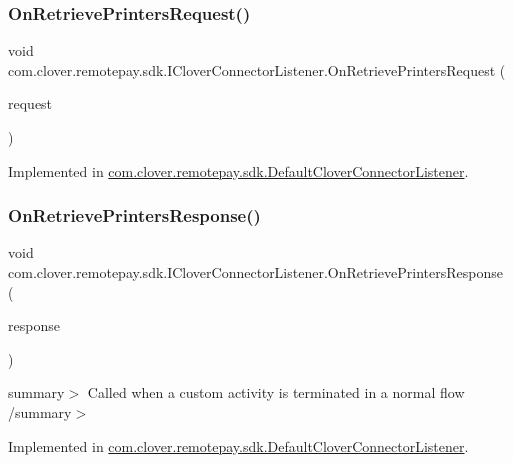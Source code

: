 \subsubsection{\texorpdfstring{On\+Retrieve\+Printers\+Request()}{OnRetrievePrintersRequest()}}
{\footnotesize\ttfamily void com.\+clover.\+remotepay.\+sdk.\+I\+Clover\+Connector\+Listener.\+On\+Retrieve\+Printers\+Request (\begin{DoxyParamCaption}\item[{Retrieve\+Printers\+Request}]{request }\end{DoxyParamCaption})}



Implemented in \hyperlink{classcom_1_1clover_1_1remotepay_1_1sdk_1_1_default_clover_connector_listener_a4a3e49c96e516bf5da1c0c1b3f701740}{com.\+clover.\+remotepay.\+sdk.\+Default\+Clover\+Connector\+Listener}.

\mbox{\label{interfacecom_1_1clover_1_1remotepay_1_1sdk_1_1_i_clover_connector_listener_ad140361fb09060287f6fde7e5ff79c2c}} 
\subsubsection{\texorpdfstring{On\+Retrieve\+Printers\+Response()}{OnRetrievePrintersResponse()}}
{\footnotesize\ttfamily void com.\+clover.\+remotepay.\+sdk.\+I\+Clover\+Connector\+Listener.\+On\+Retrieve\+Printers\+Response (\begin{DoxyParamCaption}\item[{\hyperlink{classcom_1_1clover_1_1remotepay_1_1sdk_1_1_retrieve_printers_response}{Retrieve\+Printers\+Response}}]{response }\end{DoxyParamCaption})}

summary$>$ Called when a custom activity is terminated in a normal flow /summary$>$ 

Implemented in \hyperlink{classcom_1_1clover_1_1remotepay_1_1sdk_1_1_default_clover_connector_listener_ae762b510b0e85527d434ee9dcf783684}{com.\+clover.\+remotepay.\+sdk.\+Default\+Clover\+Connector\+Listener}.

